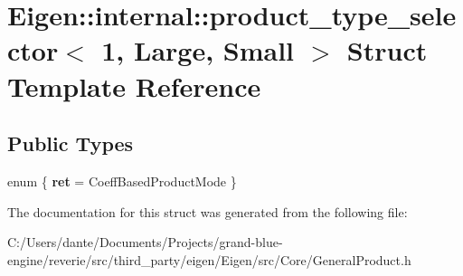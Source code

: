 \hypertarget{struct_eigen_1_1internal_1_1product__type__selector_3_011_00_01_large_00_01_small_01_4}{}\section{Eigen\+::internal\+::product\+\_\+type\+\_\+selector$<$ 1, Large, Small $>$ Struct Template Reference}
\label{struct_eigen_1_1internal_1_1product__type__selector_3_011_00_01_large_00_01_small_01_4}
\subsection*{Public Types}
\begin{DoxyCompactItemize}
\item 
\mbox{\label{struct_eigen_1_1internal_1_1product__type__selector_3_011_00_01_large_00_01_small_01_4_a8b7e531a2ec189cbc4e1e37902c07966}} 
enum \{ {\bfseries ret} = Coeff\+Based\+Product\+Mode
 \}
\end{DoxyCompactItemize}


The documentation for this struct was generated from the following file\+:\begin{DoxyCompactItemize}
\item 
C\+:/\+Users/dante/\+Documents/\+Projects/grand-\/blue-\/engine/reverie/src/third\+\_\+party/eigen/\+Eigen/src/\+Core/General\+Product.\+h\end{DoxyCompactItemize}
